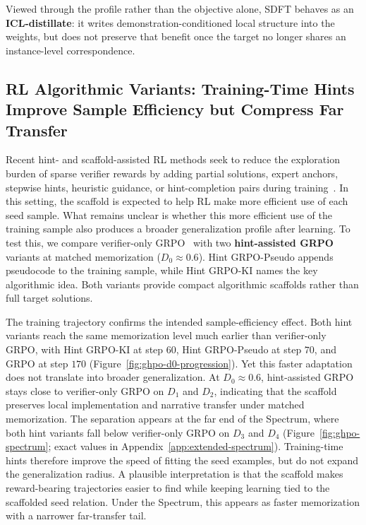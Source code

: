\documentclass[]{bytedance_seed}
\theoremstyle{plain}
\theoremstyle{definition}
\theoremstyle{remark}
\begin{document}
Viewed through the profile rather than the objective alone, SDFT behaves as an \textbf{ICL-distillate}: it writes demonstration-conditioned local structure into the weights, but does not preserve that benefit once the target no longer shares an instance-level correspondence.


\subsection{RL Algorithmic Variants: Training-Time Hints Improve Sample Efficiency but Compress Far Transfer}
\label{subsec:rl-variants}

Recent hint- and scaffold-assisted RL methods seek to reduce the exploration burden of sparse verifier rewards by adding partial solutions, expert anchors, stepwise hints, heuristic guidance, or hint-completion pairs during training~\citep{li2026questa,ghpo2025,zhang2026bread,zhang2025stephint,wang2026hint,huang2025hintgrpo,kang2025table}. In this setting, the scaffold is expected to help RL make more efficient use of each seed sample. What remains unclear is whether this more efficient use of the training sample also produces a broader generalization profile after learning. To test this, we compare verifier-only GRPO~\citep{shao2024grpo} with two \textbf{hint-assisted GRPO} variants at matched memorization ($D_0 \approx 0.6$). Hint GRPO-Pseudo appends pseudocode to the training sample, while Hint GRPO-KI names the key algorithmic idea. Both variants provide compact algorithmic scaffolds rather than full target solutions.

The training trajectory confirms the intended sample-efficiency effect. Both hint variants reach the same memorization level much earlier than verifier-only GRPO, with Hint GRPO-KI at step $60$, Hint GRPO-Pseudo at step $70$, and GRPO at step $170$ (Figure~\ref{fig:ghpo-d0-progression}). Yet this faster adaptation does not translate into broader generalization. At $D_0 \approx 0.6$, hint-assisted GRPO stays close to verifier-only GRPO on $D_1$ and $D_2$, indicating that the scaffold preserves local implementation and narrative transfer under matched memorization. The separation appears at the far end of the Spectrum, where both hint variants fall below verifier-only GRPO on $D_3$ and $D_4$ (Figure~\ref{fig:ghpo-spectrum}; exact values in Appendix~\ref{app:extended-spectrum}). Training-time hints therefore improve the speed of fitting the seed examples, but do not expand the generalization radius. A plausible interpretation is that the scaffold makes reward-bearing trajectories easier to find while keeping learning tied to the scaffolded seed relation. Under the Spectrum, this appears as faster memorization with a narrower far-transfer tail.
\end{document}
